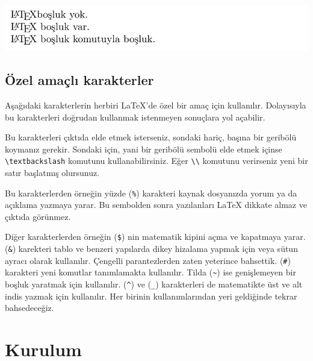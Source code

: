 \documentclass[
  10pt,
]{scrbook}
\newenvironment{Shaded}{\begin{snugshade}}{\end{snugshade}}
\newcommand{\CommentTok}[1]{\textcolor[rgb]{0.56,0.35,0.01}{\textit{#1}}}
\newcommand{\NormalTok}[1]{#1}
\newcommand{\SpecialStringTok}[1]{\textcolor[rgb]{0.31,0.60,0.02}{#1}}
\theoremstyle{definition}
\theoremstyle{definition}
\theoremstyle{definition}
\theoremstyle{definition}
\theoremstyle{remark}
\begin{document}
\insvg

\includegraphics{examples/ex2.svg} \outsvg

\hypertarget{uxf6zel-amauxe7lux131-karakterler}{%
\subsection{Özel amaçlı karakterler}\label{uxf6zel-amauxe7lux131-karakterler}}

Aşağıdaki karakterlerin herbiri LaTeX'de özel bir amaç için kullanılır. Dolayısıyla bu karakterleri doğrudan kullanmak istenmeyen sonuçlara yol açabilir.

\begin{Shaded}
\begin{Highlighting}[]
\NormalTok{\# }\SpecialStringTok{$ }\CommentTok{\%   \&   \{   \}   \textasciitilde{}  \^{}  \_ \textbackslash{}}
\end{Highlighting}
\end{Shaded}

Bu karakterleri çıktıda elde etmek isterseniz, sondaki hariç, başına bir geribölü koymanız gerekir. Sondaki için, yani bir geribölü sembolü elde etmek içinse \texttt{\textbackslash{}textbackslash} komutunu kullanabilirsiniz. Eğer \texttt{\textbackslash{}\textbackslash{}} komutunu verirseniz yeni bir satır başlatmış olursunuz.

Bu karakterlerden örneğin yüzde (\texttt{\%}) karakteri kaynak dosyanızda yorum ya da açıklama yazmaya yarar. Bu sembolden sonra yazılanları LaTeX dikkate almaz ve çıktıda görünmez.

Diğer karakterlerden örneğin (\texttt{\$}) nin matematik kipini açma ve kapatmaya yarar. (\texttt{\&}) karekteri tablo ve benzeri yapılarda dikey hizalama yapmak için veya sütun ayracı olarak kullanılır. Çengelli parantezlerden zaten yeterince bahsettik. (\texttt{\#}) karakteri yeni komutlar tanımlamakta kullanılır. Tilda (\texttt{\textasciitilde{}}) ise genişlemeyen bir boşluk yaratmak için kullanılır. (\texttt{\^{}}) ve (\texttt{\_}) karakterleri de matematikte üst ve alt indis yazmak için kullanılır. Her birinin kullanımlarından yeri geldiğinde tekrar bahsedeceğiz.

\hypertarget{kurulum}{%
\section{Kurulum}\label{kurulum}}
\end{document}
